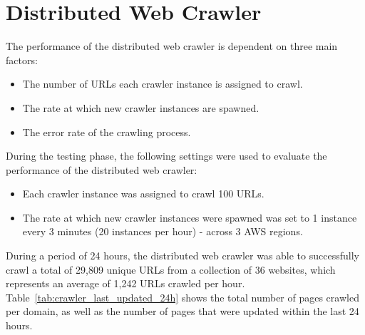 \section{Distributed Web Crawler}\label{sec:distributed_web_crawler}

The performance of the distributed web crawler is dependent on three main factors:
\begin{itemize}
    \item The number of URLs each crawler instance is assigned to crawl.
    \item The rate at which new crawler instances are spawned.
    \item The error rate of the crawling process.
\end{itemize}

During the testing phase, the following settings were used to evaluate the performance of the distributed web crawler:
\begin{itemize}
    \item Each crawler instance was assigned to crawl 100 URLs.
    \item The rate at which new crawler instances were spawned was set to 1 instance every 3 minutes (20 instances per hour) - across 3 AWS regions.
\end{itemize}

During a period of 24 hours, the distributed web crawler was able to successfully crawl a total of 29,809 unique URLs from a collection of 36 websites, which represents an average of 1,242 URLs crawled per hour.
Table~\ref{tab:crawler_last_updated_24h} shows the total number of pages crawled per domain, as well as the number of pages that were updated within the last 24 hours.

